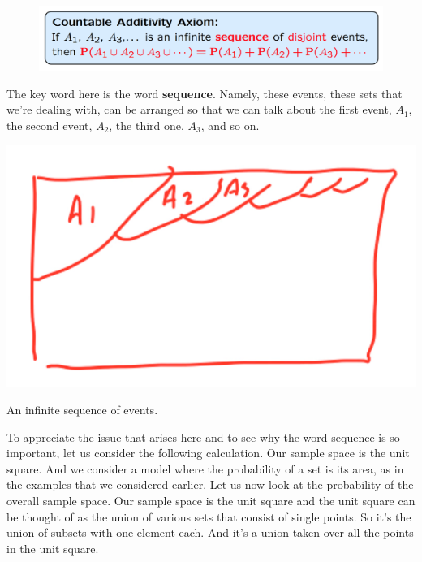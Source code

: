 \documentclass{tufte-handout}
\begin{document}
\begin{figure}
  \includegraphics{CountableAdditivityAxiom}
\end{figure}


The key word here is the word \textbf{sequence}. Namely, these events, these sets that we're dealing with, can
be arranged so that we can talk about the first event, $A_1$, the second event, $A_2$, the third one, $A_3$, and
so on.

\begin{marginfigure}
  \includegraphics{EventSequence}
  \caption{An infinite sequence of events.}
\end{marginfigure}


To appreciate the issue that arises here and to see why the word sequence is so important, let us
consider the following calculation. Our sample space is the unit square. And we consider a model where
the probability of a set is its area, as in the examples that we considered earlier. Let us now look at the
probability of the overall sample space. Our sample space is the unit square and the unit square can be
thought of as the union of various sets that consist of single points. So it's the union of subsets with one
element each. And it's a union taken over all the points in the unit square.
\end{document}
